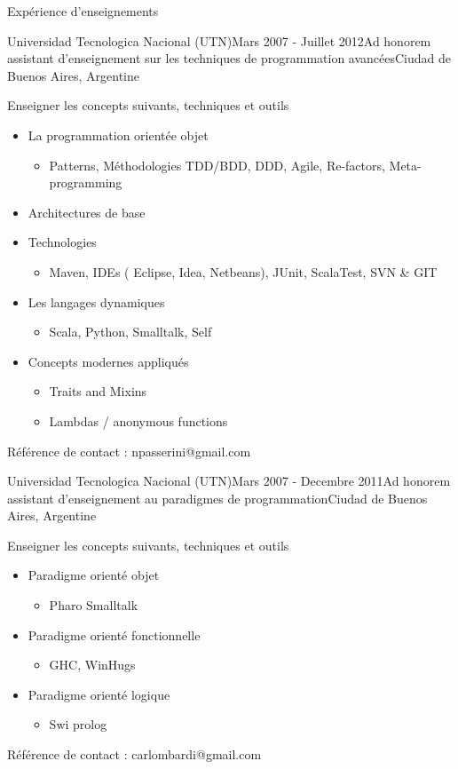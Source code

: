 \documentclass{resume} %
\begin{document}
\begin{rSection}{Exp\'{e}rience d'enseignements}
\begin{rSubsection}{Universidad Tecnologica Nacional (UTN)}{Mars 2007 - Juillet 2012}{Ad honorem assistant d'enseignement sur les techniques de programmation avanc\'{e}es}{Ciudad de Buenos Aires, Argentine}
\item Enseigner les concepts suivants, techniques et outils
\begin{itemize}
	\item La programmation orient\'{e}e objet
	\begin{itemize}
		\item Patterns, M\'ethodologies TDD/BDD, DDD, Agile, Re-factors, Meta-programming
	\end{itemize}
	\item Architectures de base
	\item Technologies
	\begin{itemize}
		\item Maven, IDEs ( Eclipse, Idea, Netbeans), JUnit, ScalaTest, SVN \& GIT
	\end{itemize}
	\item Les langages dynamiques
	\begin{itemize}
		\item  Scala, Python, Smalltalk, Self
	\end{itemize}
	\item Concepts modernes appliqu\'{e}s
	\begin{itemize}
		\item Traits and Mixins
		\item  Lambdas / anonymous functions
	\end{itemize}
\end{itemize}
\item R\'{e}f\'{e}rence de contact : npasserini@gmail.com
\end{rSubsection}

\begin{rSubsection}{Universidad Tecnologica Nacional (UTN)}{Mars 2007 - Decembre 2011}{Ad honorem assistant d'enseignement au paradigmes de programmation}{Ciudad de Buenos Aires, Argentine}
\item Enseigner les concepts suivants, techniques et outils
\begin{itemize}
	\item Paradigme orient\'{e} objet
	\begin{itemize}
		\item Pharo Smalltalk
	\end{itemize}
	\item Paradigme orient\'{e} fonctionnelle
	\begin{itemize}
		\item GHC, WinHugs
	\end{itemize}
	\item Paradigme orient\'{e} logique
	\begin{itemize}
		\item  Swi prolog
	\end{itemize}
\end{itemize}
\item R\'{e}f\'{e}rence de contact : carlombardi@gmail.com
\end{rSubsection}



\end{rSection}
\end{document}
